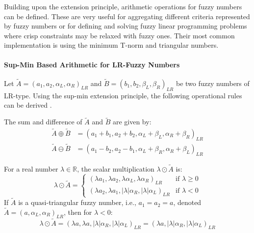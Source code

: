 Building upon the extension principle, arithmetic operations for fuzzy numbers can be defined. These are very useful for aggregating different criteria represented by fuzzy numbers or for defining and solving fuzzy linear programming problems where crisp constraints may be relaxed with fuzzy ones. Their most common implementation is using the minimum T-norm and triangular numbers.

\paragraph{Sup-Min Based Arithmetic for LR-Fuzzy Numbers}
Let $\tilde{A} = (a_1, a_2, \alpha_L, \alpha_R)_{LR}$ and $\tilde{B} = (b_1, b_2, \beta_L, \beta_R)_{LR}$ be two fuzzy numbers of LR-type. Using the sup-min extension principle, the following operational rules can be derived \cite[p.16]{FULLER2}.

\begin{proposition}
\label{prop:lr_add_sub}
The sum and difference of $\tilde{A}$ and $\tilde{B}$ are given by:
\begin{align}
\tilde{A} \oplus \tilde{B} &= (a_1+b_1, a_2+b_2, \alpha_L+\beta_L, \alpha_R+\beta_R)_{LR} \\
\tilde{A} \ominus \tilde{B} &= (a_1-b_2, a_2-b_1, \alpha_L+\beta_R, \alpha_R+\beta_L)_{LR}
\end{align}
\end{proposition}

\begin{proposition}
\label{prop:lr_scalar_mult}
For a real number $\lambda \in \mathbb{R}$, the scalar multiplication $\lambda \odot \tilde{A}$ is:
\begin{equation}
\lambda \odot \tilde{A} =
\begin{cases}
(\lambda a_1, \lambda a_2, \lambda\alpha_L, \lambda\alpha_R)_{LR} & \text{if } \lambda \ge 0 \\
(\lambda a_2, \lambda a_1, |\lambda|\alpha_R, |\lambda|\alpha_L)_{LR} & \text{if } \lambda < 0
\end{cases}
\end{equation}
If $\tilde{A}$ is a quasi-triangular fuzzy number, i.e., $a_1=a_2=a$, denoted $\tilde{A}=(a, \alpha_L, \alpha_R)_{LR}$, then for $\lambda < 0$:
\begin{equation}
\lambda \odot \tilde{A} = (\lambda a, \lambda a, |\lambda|\alpha_R, |\lambda|\alpha_L)_{LR} = (\lambda a, |\lambda|\alpha_R, |\lambda|\alpha_L)_{LR}
\end{equation}
\end{proposition}

